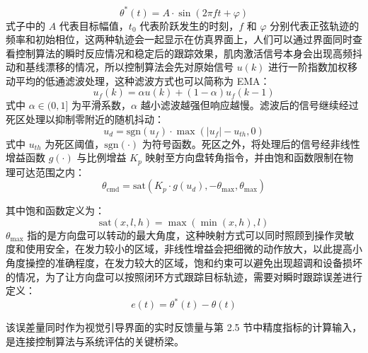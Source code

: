 \begin{equation}
\theta^{*}(t) = A \cdot \sin(2\pi f t + \varphi)
\label{eq:sin-trajectory}
\end{equation}
式子中的 $A$ 代表目标幅值，$t_0$ 代表阶跃发生的时刻，$f$ 和 $\varphi$ 分别代表正弦轨迹的频率和初始相位，这两种轨迹会一起显示在仿真界面上，人们可以通过界面同时查看控制算法的瞬时反应情况和稳定后的跟踪效果，肌肉激活信号本身会出现高频抖动和基线漂移的情况，所以控制算法会先对原始信号 $u (k)$ 进行一阶指数加权移动平均的低通滤波处理，这种滤波方式也可以简称为 EMA：
\begin{equation}
u_f(k) = \alpha u(k) + (1-\alpha) u_f(k-1)
\label{eq:ema-filter}
\end{equation}
式中 $ \alpha \in (0, 1] $ 为平滑系数，$ \alpha $ 越小滤波越强但响应越慢。滤波后的信号继续经过死区处理以抑制零附近的随机抖动：
\begin{equation}
u_d = \text{sgn}(u_f) \cdot \max(|u_f| - u_{th}, 0)
\label{eq:deadzone}
\end{equation}
式中 $ u_{th} $ 为死区阈值，$ \text{sgn}(·) $ 为符号函数。死区之外，将处理后的信号经非线性增益函数 $ g(·) $ 与比例增益 $ K_p $ 映射至方向盘转角指令，并由饱和函数限制在物理可达范围之内：
\begin{equation}
\theta_{\text{cmd}} = \text{sat}\left( K_p \cdot g(u_d), -\theta_{\max}, \theta_{\max} \right)
\label{eq:command}
\end{equation}

其中饱和函数定义为：
\begin{equation}
\text{sat}(x, l, h) = \max\left( \min(x, h), l \right)
\label{eq:saturation}
\end{equation}
$\theta_{\max}$ 指的是方向盘可以转动的最大角度，这种映射方式可以同时照顾到操作灵敏度和使用安全，在发力较小的区域，非线性增益会把细微的动作放大，以此提高小角度操控的准确程度，在发力较大的区域，饱和约束可以避免出现超调和设备损坏的情况，为了让方向盘可以按照闭环方式跟踪目标轨迹，需要对瞬时跟踪误差进行定义：
\begin{equation}
e(t) = \theta^{*}(t) - \theta(t)
\label{eq:tracking-error}
\end{equation}

该误差量同时作为视觉引导界面的实时反馈量与第 2.5 节中精度指标的计算输入，是连接控制算法与系统评估的关键桥梁。
